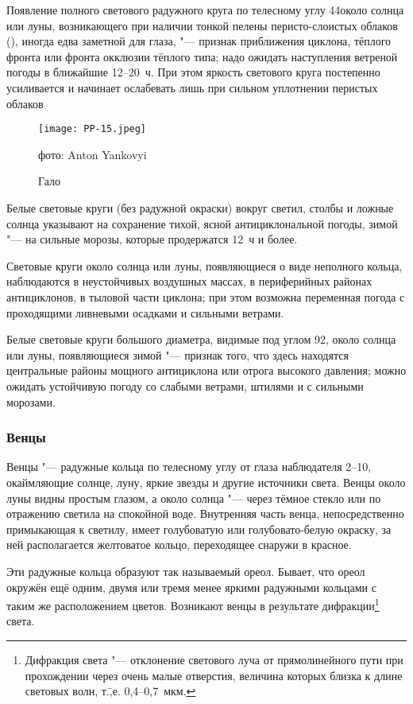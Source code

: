  Появление полного светового радужного круга по телесному углу
44\gr около солнца или луны, возникающего при наличии тонкой пелены
перисто-слоистых облаков (), иногда едва заметной для
глаза, "--- признак приближения циклона, тёплого фронта или фронта
окклюзии тёплого типа; надо ожидать наступления ветреной погоды в
ближайшие 12--20~ч. При этом яркость светового круга постепенно
усиливается и начинает ослабевать лишь при сильном уплотнении перистых
облаков

\begin{figure}[htb]
  \centering{}
  \texttt{[image: PP-15.jpeg]}
  \caption{Гало}
  \label{fig:pp15}
  \small
  \centering{}фото: Anton Yankovyi
\end{figure}

 Белые световые круги (без радужной окраски) вокруг светил,
столбы и ложные солнца указывают на сохранение тихой, ясной
антициклональной погоды, зимой "--- на сильные морозы, которые продержатся
12~ч и более.

 Световые круги около солнца или луны, появляющиеся о виде
неполного кольца, наблюдаются в неустойчивых воздушных массах, в
периферийных районах антициклонов, в тыловой части циклона; при этом
возможна переменная погода с проходящими ливневыми осадками и сильными
ветрами.

 Белые световые круги большого диаметра, видимые под углом 92\gr,
около солнца или луны, появляющиеся зимой "--- признак того, что здесь
находятся центральные районы мощного антициклона или отрога высокого
давления; можно ожидать устойчивую погоду со слабыми ветрами, штилями
и с сильными морозами.

\subsubsection{Венцы}

Венцы "--- радужные кольца по телесному углу от глаза наблюдателя
2--10\gr, окаймляющие солнце, луну, яркие звезды и другие источники
света. Венцы около луны видны простым глазом, а около солнца "--- через
тёмное стекло или по отражению светила на спокойной воде. Внутренняя
часть венца, непосредственно примыкающая к светилу, имеет голубоватую
или голубовато-белую окраску, за ней располагается желтоватое кольцо,
переходящее снаружи в красное.

Эти радужные кольца образуют так называемый ореол. Бывает, что ореол
окружён ещё одним, двумя или тремя менее яркими радужными кольцами с
таким же расположением цветов. Возникают венцы в результате
дифракции\footnote{Дифракция света "--- отклонение светового луча от
  прямолинейного пути при прохождении через очень малые отверстия,
  величина которых близка к длине световых волн,
  т.\=,е. 0,4--0,7~мкм.} света.

